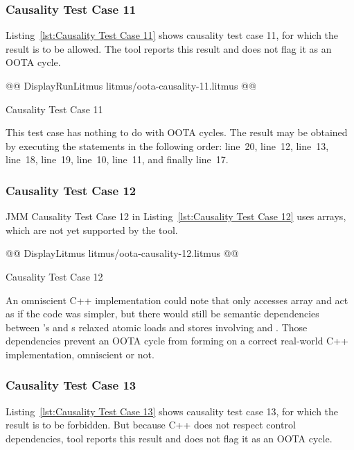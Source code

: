 \documentclass[10]{article}
\begin{document}
\subsubsection{Causality Test Case 11}
\label{app:Causality Test Case 11}

Listing~\ref{lst:Causality Test Case 11}
shows causality test case 11, for which the 
result is to be allowed.
The  tool reports this result and does not flag it as an OOTA cycle.

\begin{listing}[tbp]
@@ DisplayRunLitmus litmus/oota-causality-11.litmus @@
\caption{Causality Test Case 11}
\label{lst:Causality Test Case 11}
\end{listing}

This test case has nothing to do with OOTA cycles.
The result may be obtained by executing the statements in the following
order: line~20, line~12, line~13, line~18, line~19, line~10, line~11,
and finally line~17.

\subsubsection{Causality Test Case 12}
\label{app:Causality Test Case 12}

JMM Causality Test Case 12 in
Listing~\ref{lst:Causality Test Case 12}
uses arrays, which are not yet supported by the  tool.

\begin{listing}[tbp]
@@ DisplayLitmus litmus/oota-causality-12.litmus @@
\caption{Causality Test Case 12}
\label{lst:Causality Test Case 12}
\end{listing}

An omniscient C++ implementation could note that only  accesses
array  and act as if the code was simpler, but there would
still be semantic dependencies between 's and s
relaxed atomic loads and stores involving  and .
Those dependencies prevent an OOTA cycle from forming on a correct
real-world C++ implementation, omniscient or not.

\subsubsection{Causality Test Case 13}
\label{app:Causality Test Case 13}

Listing~\ref{lst:Causality Test Case 13}
shows causality test case 13, for which the 
result is to be forbidden.
But because C++ does not respect control dependencies,  tool
reports this result and does not flag it as an OOTA cycle.
\end{document}

